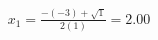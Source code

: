 \documentclass[preview]{standalone}
\begin{document}
\begin{align*}
x_1 = \frac{-(-3) + \sqrt{1}}{2(1)} = 2.00
\end{align*}
\end{document}
